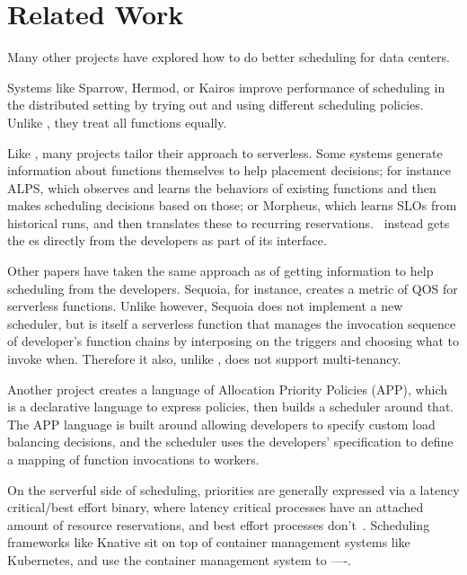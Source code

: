 \section{Related Work}

Many other projects have explored how to do better scheduling for data centers.
 
Systems like Sparrow\cite{sparrow}, Hermod\cite{hermod}, or Kairos\cite{kairos}
improve performance of scheduling in the distributed setting by trying out and
using different scheduling policies. Unlike \sys{}, they treat all functions
equally.

Like \sys{}, many projects tailor their approach to serverless. Some systems
generate information about functions themselves to help placement decisions; for
instance ALPS\cite{alps}, which observes and learns the behaviors of existing
functions and then makes scheduling decisions based on those; or
Morpheus\cite{morpheus}, which learns SLOs from historical runs, and then
translates these to recurring reservations.~\Sys{} instead gets the \class{}es
directly from the developers as part of its interface.

Other papers have taken the same approach as \sys{} of getting information to
help scheduling from the developers. Sequoia\cite{sequoia}, for instance,
creates a metric of QOS for serverless functions. Unlike \sys{} however, Sequoia
does not implement a new scheduler, but is itself a serverless function that
manages the invocation sequence of developer's function chains by interposing on
the triggers and choosing what to invoke when. Therefore it also, unlike
\sys{}, does not support multi-tenancy.

Another project\cite{app-paper} creates a language of Allocation Priority
Policies (APP), which is a declarative language to express policies, then builds
a scheduler around that. The APP language is built around allowing developers to
specify custom load balancing decisions, and the scheduler uses the developers'
specification to define a mapping of function invocations to workers. 

On the serverful side of scheduling, priorities are generally expressed via a
latency critical/best effort binary, where latency critical processes have an
attached amount of resource reservations, and best effort processes
don't~\cite{kubernetes-lc-be}. Scheduling frameworks like Knative sit on top of
container management systems like Kubernetes, and use the container management
system to ----.
